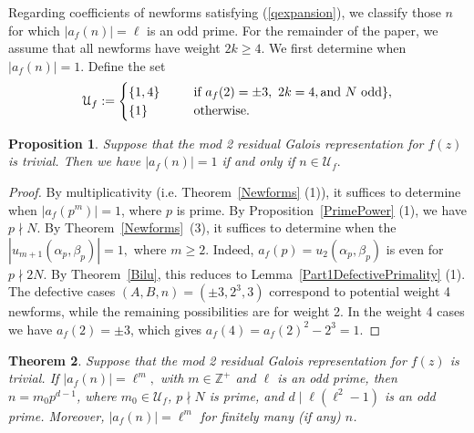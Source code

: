 \documentclass[12pt]{amsart}
\newtheorem{thm}{Theorem}[section]
\newtheorem{prop}[thm]{Proposition}
\newcommand{\Z}{\mathbb{Z}}
\newcommand{\?}{\color{red}?}
\numberwithin{equation}{section}
\begin{document}
Regarding coefficients of newforms satisfying (\ref{qexpansion}), we classify those $n$ for which
$|a_f(n)|=\ell$ is an odd prime. For the remainder of the paper, we assume that all newforms have weight $2k\geq 4$.
We first determine when $|a_f(n)|=1$. Define the set
\begin{equation}
\mathcal{U}_f:=\begin{cases} \{1, 4\}  \  \ \ \ \ &{\text {\rm if}}\ a_f(2)=\pm 3,\ 2k=4, {\text {\rm and}}\ N\ {\text {\rm odd}}\},\\
\{1\} \ \ \ \ &{\text {\rm otherwise.}}
\end{cases}
\end{equation}
\begin{prop}\label{One}
Suppose that the mod 2 residual Galois representation for $f(z)$ is trivial. Then we have
 $|a_f(n)|=1$ if and only if $n\in \mathcal{U}_f.$
\end{prop}
\begin{proof}
By multiplicativity (i.e. Theorem~\ref{Newforms} (1)), it suffices to
determine when $|a_f(p^m)|=1$, where $p$ is prime.
By Proposition~\ref{PrimePower} (1), we have $p\nmid N.$ By Theorem~\ref{Newforms}~(3), it suffices to determine when
the $|u_{m+1}(\alpha_p,\beta_p)|=1,$ where $m\geq 2.$ Indeed, $a_f(p)=u_2(\alpha_p,\beta_p)$ is even for  $p\nmid 2N$.
By Theorem~\ref{Bilu}, this reduces to
Lemma~\ref{Part1DefectivePrimality} (1).
The defective cases $(A,B,n)=(\pm 3, 2^3,3)$  correspond to potential weight 4 newforms, while the remaining possibilities
are for weight 2. In the weight 4 cases we have $a_f(2)=\pm 3$, which  gives $a_f(4)=a_f(2)^2-2^3=1.$
\end{proof}




\begin{thm}\label{LehmerVariantGeneral}
Suppose that the mod 2 residual Galois representation for $f(z)$ is trivial. If $|a_f(n)|=\ell^m,$  with $m\in \Z^{+}$ and $\ell$ is an odd prime, then 
$n= m_0p^{d-1}$, where $m_0\in \mathcal{U}_f$, $p\nmid N$ is prime, and $d \mid \ell (\ell^2-1)$
 is an odd prime.
 Moreover, $|a_f(n)|=\ell^m$ for finitely many (if any) $n$. 
\end{thm}
\end{document}
